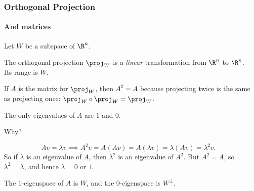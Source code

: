 \begin{frame}
\frametitle{Orthogonal Projection}
\framesubtitle{And matrices}

Let $W$ be a subspace of $\R^n$.

\begin{thm}
  The orthogonal projection $\proj_W$ is a \emph{linear} transformation from
  $\R^n$ to $\R^n$.  Its range is $W$.
\end{thm}

\pause\medskip
If $A$ is the matrix for $\proj_W$, then $A^2 = A$ because projecting twice is
the same as projecting once: $\proj_W\circ\proj_W = \proj_W$.

\pause\medskip
\begin{thm}
  The only eigenvalues of $A$ are
  \pause
  $1$ and $0$.  
\end{thm}

\medskip\alert{Why?}%
\begin{webonly}
\[ Av = \lambda v \implies A^2v = A(Av) = A(\lambda v) = \lambda(Av) = \lambda^2v. \]
So if $\lambda$ is an eigenvalue of $A$, then $\lambda^2$ is an eigenvalue of
$A^2$.
But $A^2 = A$, so $\lambda^2 = \lambda$, and hence $\lambda = 0$ or $1$.
\end{webonly}%

\pause\medskip
The $1$-eigenspace of $A$ is
\pause
$W$, and the $0$-eigenspace is
\pause
$W^\perp$.

\end{frame}



